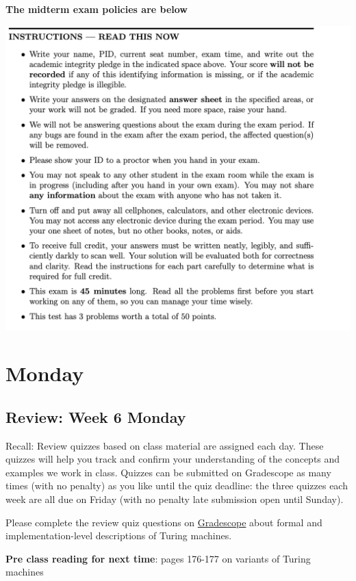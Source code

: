 {\bf The midterm exam policies are below}

\includegraphics[width=\linewidth]{../../files/midterm-instructions.png}
\newpage

\section*{Monday}


    
\newpage
\subsection*{Review: Week 6 Monday}


Recall: Review quizzes based on class material are assigned each day. 
These quizzes will help you track and confirm your understanding of the concepts and examples 
we work in class. Quizzes can be submitted on Gradescope as many times (with no penalty) as 
you like until the quiz deadline: the three quizzes each week are all due on Friday (with no penalty 
late submission open until Sunday).

Please complete the review quiz questions on \href{http://gradescope.com}{Gradescope} about 
formal and implementation-level descriptions of Turing machines.

{\bf Pre class reading for next time}: pages 176-177 on variants of Turing machines


